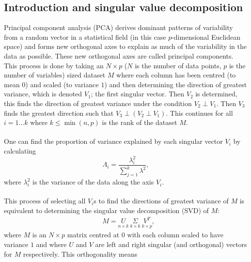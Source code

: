 \documentclass{article}
\newcommand{\numInputs}{p}
\newcommand{\numDPs}{n}
\newcommand{\numSamples}{N}
\newcommand{\LSingVecs}{U}
\newcommand{\RSingVecs}{V}
\newcommand{\basis}{V}
\newcommand{\singValMat}{\Sigma}
\newcommand{\singVal}{\lambda}
\newcommand{\varExpl}{\Lambda}
\newcommand{\matRank}{k}
\newcommand{\sampleMat}{M}
\begin{document}
\subsection{Introduction and singular value decomposition}
\label{PCA}
Principal component analysis (PCA) derives dominant patterns of variability from a random vector in a statistical field (in this case $\numInputs$-dimensional Euclidean space) \citep{Joliffe1992,storch_zwiers_1999} and forms new orthogonal axes to explain as much of the variability in the data as possible. These new orthogonal axes are called principal components. This process is done by taking an $\numSamples \times \numInputs$ ($\numSamples$ is the number of data points, $\numInputs$ is the number of variables) sized dataset $\sampleMat$ where each column has been centred (to mean $0$) and scaled (to variance $1$) and then determining the direction of greatest variance, which is denoted $\basis_1$; the first singular vector. Then $\basis_2$ is determined, this finds the direction of greatest variance under the condition $\basis_2 \perp \basis_1$. Then $\basis_3$ finds the greatest direction such that $\basis_3 \perp (\basis_2 \perp \basis_1)$. This continues for all $i=1\dots \matRank$ where $\matRank \leq \min(\numDPs,\numInputs)$ is the rank of the dataset $\sampleMat$.\\\\
One can find the proportion of variance explained by each singular vector $\basis_i$ by calculating 
\begin{equation}
    \label{prop_expl}
    \varExpl_i = \frac{\singVal_i^2}{\sum_{j=1}^\matRank \singVal^2},
\end{equation}
where $\singVal_i^2$ is the variance of the data along the axis $\basis_i$.\\\\
This process of selecting all $\basis_i$s to find the directions of greatest variance of $\sampleMat$ is equivalent to determining the singular value decomposition (SVD) of $\sampleMat$:
\begin{align}
    & \sampleMat = \underset{\numDPs \times \matRank}{\LSingVecs} \ \underset{\matRank \times \matRank}{\singValMat} \ \underset{\matRank \times \numInputs}{\RSingVecs^T},
    \label{SVD}
\end{align}
where $\sampleMat$ is an $\numSamples \times \numInputs$ matrix centred at $0$ with each column scaled to have variance $1$ and where $\LSingVecs$ and $\RSingVecs$ are left and right singular (and orthogonal) vectors for $\sampleMat$ respectively. This orthogonality means
\end{document}
